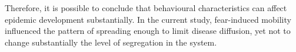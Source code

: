 \documentclass[11pt,a4paper]{article}
\begin{document}
Therefore, it is possible to conclude that behavioural characteristics can affect epidemic development substantially. In the current study, fear-induced mobility influenced the pattern of spreading enough to limit disease diffusion, yet not to change substantially the level of segregation in the system.

\newpage

\renewcommand{\refname}{Literature}


\end{document}

